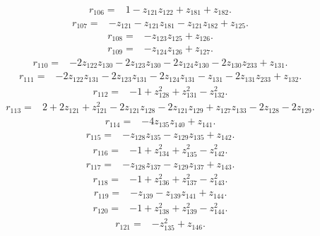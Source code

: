 \begin{align*}
 r_{106}={}&1-z_{121}z_{122}+z_{181}+z_{182} .
\end{align*}
\begin{align*}
 r_{107}={}&-z_{121}-z_{121}z_{181}-z_{121}z_{182}+z_{125} .
\end{align*}
\begin{align*}
 r_{108}={}&-z_{123}z_{125}+z_{126} .
\end{align*}
\begin{align*}
 r_{109}={}&-z_{124}z_{126}+z_{127} .
\end{align*}
\begin{align*}
 r_{110}={}&-2z_{122}z_{130}-2z_{123}z_{130}-2z_{124}z_{130}-2z_{130}z_{233}+z_{131} .
\end{align*}
\begin{align*}
 r_{111}={}&-2z_{122}z_{131}-2z_{123}z_{131}-2z_{124}z_{131}-z_{131}-2z_{131}z_{233}+z_{132} .
\end{align*}
\begin{align*}
 r_{112}={}&-1+z_{128}^{2}+z_{131}^{2}-z_{132}^{2} .
\end{align*}
\begin{align*}
 r_{113}={}&2+2z_{121}+z_{121}^{2}-2z_{121}z_{128}-2z_{121}z_{129}+z_{127}z_{133}-2z_{128}-2z_{129} .
\end{align*}
\begin{align*}
 r_{114}={}&-4z_{135}z_{140}+z_{141} .
\end{align*}
\begin{align*}
 r_{115}={}&-z_{128}z_{135}-z_{129}z_{135}+z_{142} .
\end{align*}
\begin{align*}
 r_{116}={}&-1+z_{134}^{2}+z_{135}^{2}-z_{142}^{2} .
\end{align*}
\begin{align*}
 r_{117}={}&-z_{128}z_{137}-z_{129}z_{137}+z_{143} .
\end{align*}
\begin{align*}
 r_{118}={}&-1+z_{136}^{2}+z_{137}^{2}-z_{143}^{2} .
\end{align*}
\begin{align*}
 r_{119}={}&-z_{139}-z_{139}z_{141}+z_{144} .
\end{align*}
\begin{align*}
 r_{120}={}&-1+z_{138}^{2}+z_{139}^{2}-z_{144}^{2} .
\end{align*}
\begin{align*}
 r_{121}={}&-z_{135}^{2}+z_{146} .
\end{align*}
